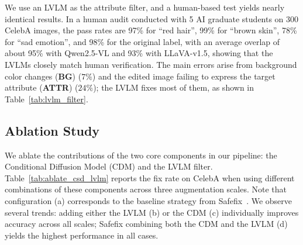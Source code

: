 \documentclass[10pt]{article} %
\newcommand{\model}{Safefix\xspace}
\newcommand{\hibug}{Safefix\xspace}
\newcommand{\qwen}{Qwen2.5-VL\xspace}
\newcommand{\llava}{LLaVA-v1.5\xspace}
\begin{document}
We use an LVLM as the attribute filter, and a human-based test yields nearly identical results. In a human audit conducted with 5 AI graduate students on 300 CelebA images, the pass rates are 97\% for ``red hair'', 99\% for ``brown skin'', 78\% for ``sad emotion'', and 98\% for the original label, with an average overlap of about 95\% with \qwen{} and 93\% with \llava{}, showing that the LVLMs closely match human verification. The main errors arise from background color changes (\textbf{BG}) ($7\%$) and the edited image failing to express the target attribute (\textbf{ATTR}) ($24\%$); the LVLM fixes most of them, as shown in Table~\ref{tab:lvlm_filter}.

\subsection{Ablation Study}
\label{sec:ablation}

\begin{table}
  \vspace{-15pt}
  \centering
  \setlength{\tabcolsep}{4pt}
  \renewcommand{\arraystretch}{1.0}
  \small
  \caption{Ablation on the impact of CDM and LVLM components at different scales, reported as Fix Rate (FR \%).}
  \label{tab:ablate_csd_lvlm}
  \vspace{-10pt}
\end{table}

We ablate the contributions of the two core components in our pipeline: the Conditional Diffusion Model (CDM) and the LVLM filter. Table~\ref{tab:ablate_csd_lvlm} reports the fix rate on CelebA when using different combinations of these components across three augmentation scales. Note that configuration (a) corresponds to the baseline strategy from \hibug~\citep{chen2023hibug}. We observe several trends: adding either the LVLM (b) or the CDM (c) individually improves accuracy across all scales; \model combining both the CDM and the LVLM (d) yields the highest performance in all cases.
\end{document}
